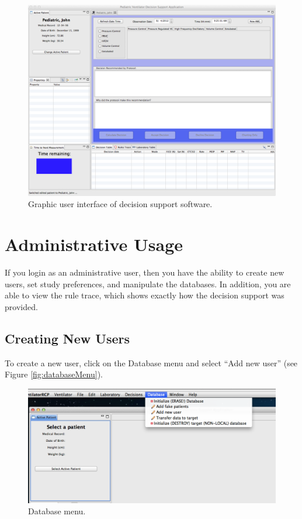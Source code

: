 \begin{figure}[htbp] 
   \centering
   \includegraphics[width=\textwidth]{WholeAppBeforeModeSelect} 
   \caption{Graphic user interface of decision support software.}
   \label{fig:appBeforeMode}
\end{figure}

\section{Administrative Usage}

If you login as an administrative user, then you have the ability to create new users, set study preferences,
and manipulate the databases.  In addition, you are able to view the rule trace, which shows exactly how the
decision support was provided.

\subsection{Creating New Users}
To create a new user, click on the Database menu and select ``Add new user'' (see Figure \vref{fig:databaseMenu}).  


\begin{figure}[htbp] 
   \centering
   \includegraphics[width=\textwidth]{DatabaseMenu} 
   \caption{Database menu.}
   \label{fig:databaseMenu}
\end{figure}

